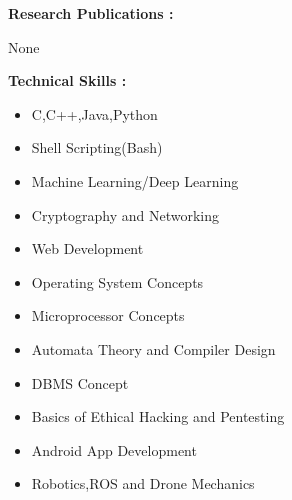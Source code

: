 \documentclass[11pt,a4paper]{article}
\begin{document}
\hfill
\begin{multicols}{2}
	\begin{minipage}{0.17\paperwidth}
		\textbf{Research\linebreak
			Publications : }
	\end{minipage}
	\begin{minipage}{0.7\paperwidth}
	    	None
	\end{minipage}
\end{multicols}
\hfill
\begin{multicols}{3}
	\begin{minipage}{0.15\paperwidth}
		\textbf{Technical\linebreak
			Skills : }
	\end{minipage}
	\begin{minipage}{0.35\paperwidth}
		\begin{flushleft}
			\begin{itemize}
				\item C,C++,Java,Python
				\item Shell Scripting(Bash)
				\item Machine Learning\//Deep Learning
				\item Cryptography and Networking
				\item Web Development
				\item Operating System Concepts
				\item Microprocessor Concepts
			\end{itemize}
		\end{flushleft}
	\end{minipage}
	\begin{flushright}
	\begin{minipage}{0.35\paperwidth}
		\begin{flushleft}
			\begin{itemize}
				\item Automata Theory and\linebreak
				 Compiler Design
				\item DBMS Concept
				\item Basics of Ethical\linebreak
				 Hacking and Pentesting
				\item Android App Development
				\item Robotics,ROS and\linebreak
				Drone Mechanics
			\end{itemize}
		\end{flushleft}
	\end{minipage}
	\end{flushright}
\end{multicols}
\end{document}
